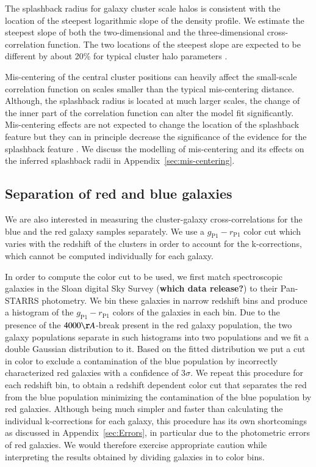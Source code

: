 \documentclass[iop, apjl, twocolappendix, numberedappendix]{emulateapj}
\begin{document}
The splashback radius for galaxy cluster scale halos is consistent
with the location of the steepest logarithmic slope of the density
profile. We estimate the steepest slope of both the two-dimensional
and the three-dimensional cross-correlation function. The two
locations of the steepest slope are expected to be different by
about 20\% for typical cluster halo parameters
\citep{diemer2014dependence, more2016detection}.

Mis-centering of the central cluster positions can heavily affect 
the small-scale correlation function on scales smaller than the typical mis-centering distance. 
Although, the splashback radius is located at much larger scales, 
the change of the inner part of the correlation function can alter the model fit significantly. 
Mis-centering effects are not expected to change the location of the splashback feature 
but they can in principle decrease the significance of the evidence for the splashback feature \citep{baxter2017halo}.
We discuss the modelling of mis-centering and its effects on the inferred splashback radii in Appendix~\ref{sec:mis-centering}.
\subsection{Separation of red and blue galaxies}
\label{sec:Color}

We are also interested in measuring the cluster-galaxy
cross-correlations for the blue and the red galaxy samples
separately. We use a $g_{\mathrm{P1}}-r_{\mathrm{P1}}$ color cut
which varies with the redshift of the clusters in order to account
for the k-corrections, which cannot be computed individually for
each galaxy.

In order to compute the color cut to be used, we first match spectroscopic
galaxies in the Sloan digital Sky Survey ({\bf which data release?}) to their
Pan-STARRS photometry. We bin these galaxies in narrow redshift bins and
produce a histogram of the $g_{\mathrm{P1}}-r_{\mathrm{P1}}$ colors of the
galaxies in each bin. Due to the presence of the $4000\AA$-break present in the
red galaxy population, the two galaxy populations separate in such histograms
into two populations and we fit a double Gaussian distribution to it.  Based on
the fitted distribution we put a cut in color to exclude a contamination of the
blue population by incorrectly characterized red galaxies with a confidence of
3$\sigma$. We repeat this procedure for each redshift bin, to obtain a redshift
dependent color cut that separates the red from the blue population minimizing
the contamination of the blue population by red galaxies. Although being much
simpler and faster than calculating the individual k-corrections for each
galaxy, this procedure has its own shortcomings as discussed in
Appendix~\ref{sec:Errors}, in particular due to the photometric errors of red
galaxies. We would therefore exercise appropriate caution while interpreting
the results obtained by dividing galaxies in to color bins.
\end{document}
